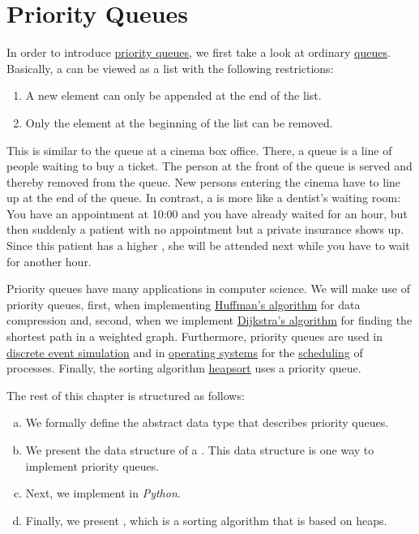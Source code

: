 \chapter{Priority Queues \label{chap:prioqueue}}
In order to introduce \href{https://en.wikipedia.org/wiki/Priority_queue}{priority queues},
we first take a look at ordinary
\href{https://en.wikipedia.org/wiki/Queue_(abstract_data_type)}{queues}.
Basically, a  can be viewed as a list with the following restrictions:
\begin{enumerate}
\item A new element can only be appended at the end of the list.
\item Only the element at the beginning of the list can be removed.
\end{enumerate}
This is similar to the queue at a cinema box office.  There, a queue is a line of people
waiting to buy a ticket.  The person at the front of the queue is served and thereby removed from
the queue.  New persons entering the cinema have to line up at the end of the queue.  In contrast, a
 is more like a dentist's waiting room: You have an appointment at 10:00 and you
have already waited for an hour, but then suddenly a patient with no appointment but a private insurance
shows up.  Since this patient has a higher , she will be attended next while you have
to wait for another hour. 

Priority queues have many applications in computer science.  We will make use of priority queues,
first, when implementing \href{https://en.wikipedia.org/wiki/Huffman_coding}{Huffman's algorithm}
for data compression and, second, when we implement
\href{https://en.wikipedia.org/wiki/Dijkstra%27s_algorithm}{Dijkstra's algorithm} 
for finding the shortest path in a weighted graph.  Furthermore, priority 
queues are used in \href{https://en.wikipedia.org/wiki/Discrete_event_simulation}{discrete event simulation}
and in \href{https://en.wikipedia.org/wiki/Operating_system}{operating systems} for the
\href{https://en.wikipedia.org/wiki/Scheduling_(computing)}{scheduling} of 
processes. Finally, the sorting algorithm \href{https://en.wikipedia.org/wiki/Heapsort}{heapsort} uses a
priority queue. 

The rest of this chapter is structured as follows:
\begin{enumerate}[(a)]
\item We formally define the abstract data type  that describes priority queues.
\item We present the data structure of a .  This data structure is one way to implement
      priority queues.
\item Next, we implement  in \textsl{Python}.
\item Finally, we present , which is a sorting algorithm that is based on heaps.
\end{enumerate}

